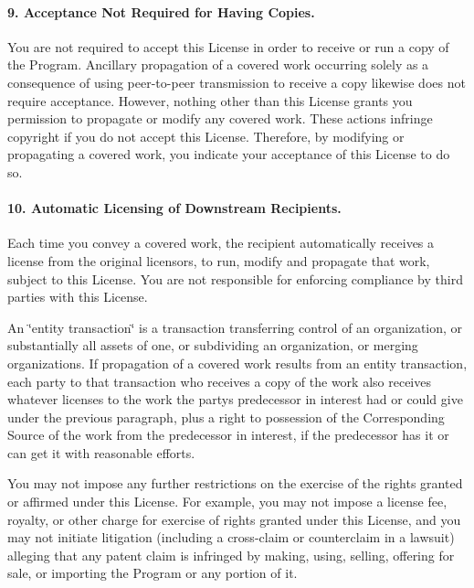 \paragraph*{9. Acceptance Not Required for Having Copies.}

You are not required to accept this License in order to receive or run a copy of the Program. Ancillary propagation of a covered work occurring solely as a consequence of using peer-\/to-\/peer transmission to receive a copy likewise does not require acceptance. However, nothing other than this License grants you permission to propagate or modify any covered work. These actions infringe copyright if you do not accept this License. Therefore, by modifying or propagating a covered work, you indicate your acceptance of this License to do so.

\paragraph*{10. Automatic Licensing of Downstream Recipients.}

Each time you convey a covered work, the recipient automatically receives a license from the original licensors, to run, modify and propagate that work, subject to this License. You are not responsible for enforcing compliance by third parties with this License.

An \char`\"{}entity transaction\char`\"{} is a transaction transferring control of an organization, or substantially all assets of one, or subdividing an organization, or merging organizations. If propagation of a covered work results from an entity transaction, each party to that transaction who receives a copy of the work also receives whatever licenses to the work the party\textquotesingle{}s predecessor in interest had or could give under the previous paragraph, plus a right to possession of the Corresponding Source of the work from the predecessor in interest, if the predecessor has it or can get it with reasonable efforts.

You may not impose any further restrictions on the exercise of the rights granted or affirmed under this License. For example, you may not impose a license fee, royalty, or other charge for exercise of rights granted under this License, and you may not initiate litigation (including a cross-\/claim or counterclaim in a lawsuit) alleging that any patent claim is infringed by making, using, selling, offering for sale, or importing the Program or any portion of it.

